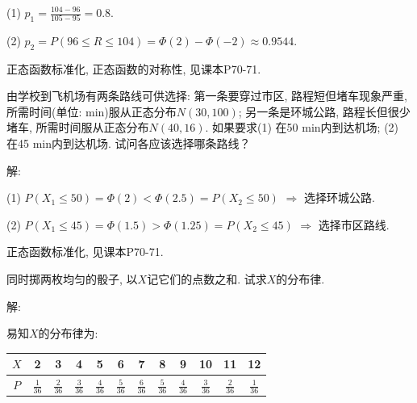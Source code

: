 \documentclass[standard]{ExBook}
\begin{document}
\begin{qitems}
\begin{bbox}
(1) $p_{1}=\frac{104-96}{105-95}=0.8$.

(2) $p_{2}=P(96\leq R\leq 104)=\Phi(2)-\Phi(-2)\approx0.9544$.

\textcolor{themeColor}{\selectfont {} 正态函数标准化, 正态函数的对称性, 见课本P70-71.}
    \end{bbox}

\vspace{-5em}

    \begin{bbox}
    \begin{shaded}
        \qitem
由学校到飞机场有两条路线可供选择: 第一条要穿过市区, 路程短但堵车现象严重, 所需时间(单位: min)服从正态分布$N(30,100)$; 另一条是环城公路, 路程长但很少堵车, 所需时间服从正态分布$N(40,16)$. 如果要求(1) 在50 min内到达机场; (2) 在45 min内到达机场. 试问各应该选择哪条路线？
    \end{shaded}
    \end{bbox}

\vspace{-5em}

    \begin{bbox}
解: 

(1) $P(X_{1}\leq50)=\Phi(2)<\Phi(2.5)=P(X_{2}\leq50)$ $\Longrightarrow$ 选择环城公路.

(2) $P(X_{1}\leq45)=\Phi(1.5)>\Phi(1.25)=P(X_{2}\leq45)$ $\Longrightarrow$ 选择市区路线.

\textcolor{themeColor}{\selectfont {} 正态函数标准化, 见课本P70-71.}
    \end{bbox}

\vspace{-5em}

    \begin{bbox}
    \begin{shaded}
        \qitem
同时掷两枚均匀的骰子, 以$X$记它们的点数之和. 试求$X$的分布律.
    \end{shaded}
    \end{bbox}

\vspace{-5em}

    \begin{bbox}
解: 

易知$X$的分布律为:
\begin{center}
\setlength{\tabcolsep}{12pt}
\begin{tabular}{c|ccccccccccc}
    \hline
    $X$ & 2 & 3 & 4 & 5 & 6 & 7 & 8 & 9 & 10 & 11 & 12\\
    \hline
    $P$ & $\frac{1}{36}$ & $\frac{2}{36}$ & $\frac{3}{36}$ & $\frac{4}{36}$ & $\frac{5}{36}$ & $\frac{6}{36}$ & $\frac{5}{36}$ & $\frac{4}{36}$ & $\frac{3}{36}$ & $\frac{2}{36}$ & $\frac{1}{36}$ \\
    \hline
\end{tabular}
\end{center}
    \end{bbox}


\end{qitems}
\end{document}
